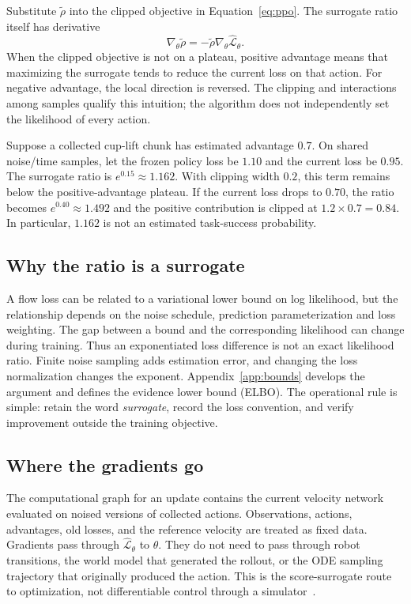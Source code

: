 Substitute $\tilde\rho$ into the clipped objective in Equation~\eqref{eq:ppo}. The surrogate ratio itself has derivative
\begin{equation}
 \nabla_\theta\tilde\rho
 =-\tilde\rho\nabla_\theta\widehat{\mathcal L}_\theta.
 \label{eq:fpo-gradient}
\end{equation}
When the clipped objective is not on a plateau, positive advantage means that maximizing the surrogate tends to reduce the current loss on that action. For negative advantage, the local direction is reversed. The clipping and interactions among samples qualify this intuition; the algorithm does not independently set the likelihood of every action.

Suppose a collected cup-lift chunk has estimated advantage $0.7$. On shared noise/time samples, let the frozen policy loss be $1.10$ and the current loss be $0.95$. The surrogate ratio is $e^{0.15}\approx1.162$. With clipping width $0.2$, this term remains below the positive-advantage plateau. If the current loss drops to $0.70$, the ratio becomes $e^{0.40}\approx1.492$ and the positive contribution is clipped at $1.2\times0.7=0.84$. In particular, $1.162$ is not an estimated task-success probability.

\subsection{Why the ratio is a surrogate}
A flow loss can be related to a variational lower bound on log likelihood, but the relationship depends on the noise schedule, prediction parameterization and loss weighting. The gap between a bound and the corresponding likelihood can change during training. Thus an exponentiated loss difference is not an exact likelihood ratio. Finite noise sampling adds estimation error, and changing the loss normalization changes the exponent. Appendix~\ref{app:bounds} develops the argument and defines the evidence lower bound (ELBO). The operational rule is simple: retain the word \emph{surrogate}, record the loss convention, and verify improvement outside the training objective.

\subsection{Where the gradients go}
The computational graph for an update contains the current velocity network evaluated on noised versions of collected actions. Observations, actions, advantages, old losses, and the reference velocity are treated as fixed data. Gradients pass through $\widehat{\mathcal L}_\theta$ to $\theta$. They do not need to pass through robot transitions, the world model that generated the rollout, or the ODE sampling trajectory that originally produced the action. This is the score-surrogate route to optimization, not differentiable control through a simulator~\citep{fpo,fpoblog}.

